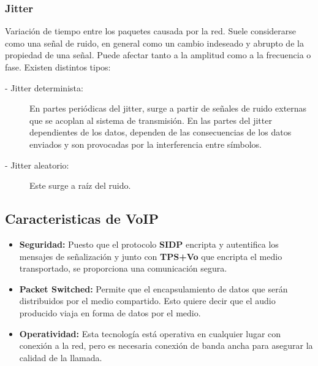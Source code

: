 \documentclass[a4paper, 11pt]{article} %
\begin{document}
		\subsubsection{Jitter} \label{jitter}
			Variación de tiempo entre los paquetes causada por la red. Suele considerarse como una señal de ruido, en general como un cambio indeseado y abrupto de la propiedad de una señal. Puede afectar tanto a la amplitud como a la frecuencia o fase.
			Existen distintos tipos:
			\begin{description}
				\item[- Jitter determinista:] En partes periódicas del jitter, surge a partir de señales de ruido externas que se acoplan al sistema de transmisión. En las partes del jitter dependientes de los datos, dependen de las consecuencias de los datos enviados y son provocadas por la interferencia entre símbolos.
				\item[- Jitter aleatorio:] Este surge a raíz del ruido.
			\end{description}
		\subsection{Caracteristicas de VoIP}
		\begin{itemize}
			\item \textbf{Seguridad:} Puesto que el protocolo \textbf{SIDP} encripta y autentifica los mensajes de señalización y junto con \textbf{TP{S+Vo}} que encripta el medio transportado, se proporciona una comunicación segura.
			\item \textbf{Packet Switched:} Permite que el encapsulamiento de datos que serán distribuidos por el medio compartido. Esto quiere decir que el audio producido viaja en forma de datos por el medio.
			\item \textbf{Operatividad:} Esta tecnología está operativa en cualquier lugar con conexión a la red, pero es necesaria conexión de banda ancha para asegurar la calidad de la llamada.
		\end{itemize}
\end{document}
